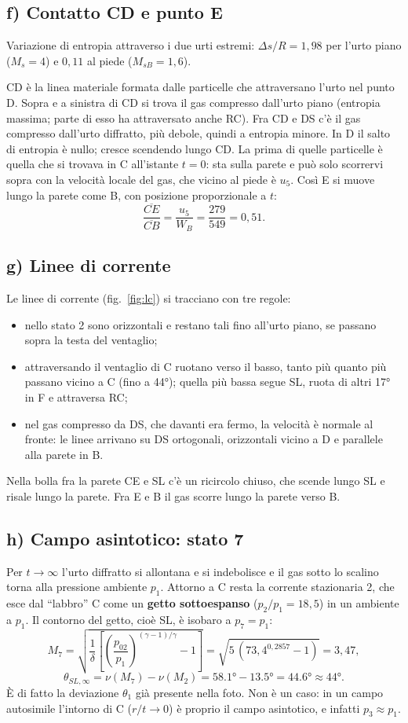 \documentclass[11pt,a4paper]{article}
\newcommand{\Ms}{M_{s}}
\begin{document}
\subsection*{f) Contatto CD e punto E}
Variazione di entropia attraverso i due urti estremi:
$\Delta s/R=1{,}98$ per l'urto piano ($\Ms=4$) e $0{,}11$ al piede ($M_{sB}=1{,}6$).

CD è la linea materiale formata dalle particelle che attraversano l'urto nel punto D. Sopra e a sinistra di CD si trova
il gas compresso dall'urto piano (entropia massima; parte di esso ha attraversato anche RC). Fra CD e DS c'è il gas
compresso dall'urto diffratto, più debole, quindi a entropia minore. In D il salto di entropia è nullo; cresce
scendendo lungo CD. La prima di quelle particelle è quella che si trovava in C all'istante $t=0$: sta sulla parete e
può solo scorrervi sopra con la velocità locale del gas, che vicino al piede è $u_5$. Così E si muove lungo la parete
come B, con posizione proporzionale a $t$:
\[
\frac{\overline{CE}}{\overline{CB}}=\frac{u_5}{W_B}=\frac{279}{549}=0{,}51 .
\]

\subsection*{g) Linee di corrente}
Le linee di corrente (fig.~\ref{fig:lc}) si tracciano con tre regole:
\begin{itemize}
\item nello stato 2 sono orizzontali e restano tali fino all'urto piano, se passano sopra la testa del ventaglio;
\item attraversando il ventaglio di C ruotano verso il basso, tanto più quanto più passano vicino a C (fino a
  \ang{44}); quella più bassa segue SL, ruota di altri \ang{17} in F e attraversa RC;
\item nel gas compresso da DS, che davanti era fermo, la velocità è normale al fronte: le linee arrivano su DS
  ortogonali, orizzontali vicino a D e parallele alla parete in B.
\end{itemize}
Nella bolla fra la parete CE e SL c'è un ricircolo chiuso, che scende lungo SL e risale lungo la parete. Fra E e B il
gas scorre lungo la parete verso B.

\subsection*{h) Campo asintotico: stato 7}
Per $t\to\infty$ l'urto diffratto si allontana e si indebolisce e il gas sotto lo scalino torna alla pressione
ambiente $p_1$. Attorno a C resta la corrente stazionaria 2, che esce dal ``labbro'' C come un \textbf{getto
sottoespanso} ($p_2/p_1=18{,}5$) in un ambiente a $p_1$. Il contorno del getto, cioè SL, è isobaro a $p_7=p_1$:
\[
M_7=\sqrt{\frac1\delta\left[\left(\frac{p_{02}}{p_1}\right)^{(\gamma-1)/\gamma}-1\right]}
=\sqrt{5\,(73{,}4^{0{,}2857}-1)}=3{,}47,
\]
\[
\theta_{SL,\infty}=\nu(M_7)-\nu(M_2)=\ang{58.1}-\ang{13.5}=\ang{44.6}\approx\ang{44}.
\]
È di fatto la deviazione $\theta_1$ già presente nella foto. Non è un caso: in un campo autosimile l'intorno di C
($r/t\to0$) è proprio il campo asintotico, e infatti $p_3\approx p_1$.
\end{document}
